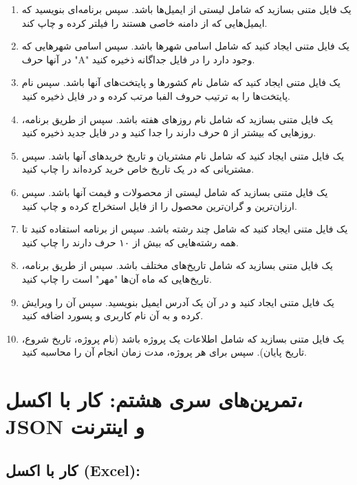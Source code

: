 \documentclass[a4paper,12pt]{article}
\begin{document}
	\begin{enumerate}
		\item یک فایل متنی بسازید که شامل لیستی از ایمیل‌ها باشد. سپس برنامه‌ای بنویسید که ایمیل‌هایی که از دامنه خاصی هستند را فیلتر کرده و چاپ کند.
		\item یک فایل متنی ایجاد کنید که شامل اسامی شهرها باشد. سپس اسامی شهرهایی که در آنها حرف "A" وجود دارد را در فایل جداگانه ذخیره کنید.
		\item یک فایل متنی ایجاد کنید که شامل نام کشورها و پایتخت‌های آنها باشد. سپس نام پایتخت‌ها را به ترتیب حروف الفبا مرتب کرده و در فایل ذخیره کنید.
		\item یک فایل متنی بسازید که شامل نام روزهای هفته باشد. سپس از طریق برنامه، روزهایی که بیشتر از ۵ حرف دارند را جدا کنید و در فایل جدید ذخیره کنید.
		\item یک فایل متنی ایجاد کنید که شامل نام مشتریان و تاریخ خریدهای آنها باشد. سپس مشتریانی که در یک تاریخ خاص خرید کرده‌اند را چاپ کنید.
		\item یک فایل متنی بسازید که شامل لیستی از محصولات و قیمت آنها باشد. سپس ارزان‌ترین و گران‌ترین محصول را از فایل استخراج کرده و چاپ کنید.
		\item یک فایل متنی ایجاد کنید که شامل چند رشته باشد. سپس از برنامه استفاده کنید تا همه رشته‌هایی که بیش از ۱۰ حرف دارند را چاپ کنید.
		\item یک فایل متنی بسازید که شامل تاریخ‌های مختلف باشد. سپس از طریق برنامه، تاریخ‌هایی که ماه آن‌ها "مهر" است را چاپ کنید.
		\item یک فایل متنی ایجاد کنید و در آن یک آدرس ایمیل بنویسید. سپس آن را ویرایش کرده و به آن نام کاربری و پسورد اضافه کنید.
		\item یک فایل متنی بسازید که شامل اطلاعات یک پروژه باشد (نام پروژه، تاریخ شروع، تاریخ پایان). سپس برای هر پروژه، مدت زمان انجام آن را محاسبه کنید.
	\end{enumerate}
	
	
	
	
	
	\newpage
	\section*{تمرین‌های سری هشتم: کار با اکسل، JSON و اینترنت}
	
	\subsection*{کار با اکسل (Excel):}
	
\end{document}
